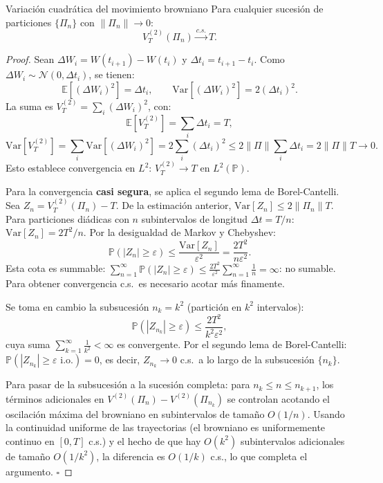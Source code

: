 \begin{teorema}{Variación cuadrática del movimiento browniano}
\label{thm:vc}
Para cualquier sucesión de particiones $\{\Pi_n\}$ con $\|\Pi_n\| \to 0$:
\[
  V_T^{(2)}(\Pi_n) \xrightarrow{c.s.} T.
\]
\end{teorema}

\begin{proof}
Sean $\Delta W_i = W(t_{i+1})-W(t_i)$ y $\Delta t_i = t_{i+1}-t_i$.
Como $\Delta W_i \sim \mathcal{N}(0,\Delta t_i)$, se tienen:
\[
  \mathbb{E}[(\Delta W_i)^2] = \Delta t_i,
  \qquad
  \mathrm{Var}[(\Delta W_i)^2] = 2(\Delta t_i)^2.
\]
La suma es $V_T^{(2)} = \sum_i (\Delta W_i)^2$, con:
\[
  \mathbb{E}[V_T^{(2)}] = \sum_i \Delta t_i = T,
\]
\[
  \mathrm{Var}[V_T^{(2)}]
  = \sum_i \mathrm{Var}[(\Delta W_i)^2]
  = 2\sum_i(\Delta t_i)^2
  \leq 2\|\Pi\|\sum_i \Delta t_i = 2\|\Pi\|T \to 0.
\]
Esto establece convergencia en $L^2$: $V_T^{(2)} \to T$ en $L^2(\mathbb{P})$.

Para la convergencia \textbf{casi segura}, se aplica el segundo lema de
Borel-Cantelli. Sea $Z_n = V_T^{(2)}(\Pi_n) - T$. De la estimación anterior,
$\mathrm{Var}[Z_n] \leq 2\|\Pi_n\|T$. Para particiones diádicas con $n$
subintervalos de longitud $\Delta t = T/n$:
$\mathrm{Var}[Z_n] = 2T^2/n$.
Por la desigualdad de Markov y Chebyshev:
\[
  \mathbb{P}(|Z_n| \geq \varepsilon)
  \leq \frac{\mathrm{Var}[Z_n]}{\varepsilon^2}
  = \frac{2T^2}{n\varepsilon^2}.
\]
Esta cota es summable: $\sum_{n=1}^\infty \mathbb{P}(|Z_n| \geq \varepsilon) \leq
\frac{2T^2}{\varepsilon^2}\sum_{n=1}^\infty \frac{1}{n} = \infty$: no sumable.
Para obtener convergencia c.s.\ es necesario acotar más finamente.

Se toma en cambio la subsucesión $n_k = k^2$ (partición en $k^2$ intervalos):
\[
  \mathbb{P}(|Z_{n_k}| \geq \varepsilon)
  \leq \frac{2T^2}{k^2\varepsilon^2},
\]
cuya suma $\sum_{k=1}^\infty \frac{1}{k^2} < \infty$ es convergente. Por el
segundo lema de Borel-Cantelli:
$\mathbb{P}(|Z_{n_k}| \geq \varepsilon \text{ i.o.}) = 0$,
es decir, $Z_{n_k} \to 0$ c.s.\ a lo largo de la subsucesión $\{n_k\}$.

Para pasar de la subsucesión a la sucesión completa: para $n_k \leq n \leq
n_{k+1}$, los términos adicionales en $V^{(2)}(\Pi_n) - V^{(2)}(\Pi_{n_k})$
se controlan acotando el oscilación máxima del browniano en subintervalos
de tamaño $O(1/n)$. Usando la continuidad uniforme de las trayectorias
(el browniano es uniformemente continuo en $[0,T]$ c.s.) y el hecho de que
hay $O(k^2)$ subintervalos adicionales de tamaño $O(1/k^2)$, la diferencia
es $O(1/k)$ c.s., lo que completa el argumento. $\square$
\end{proof}

